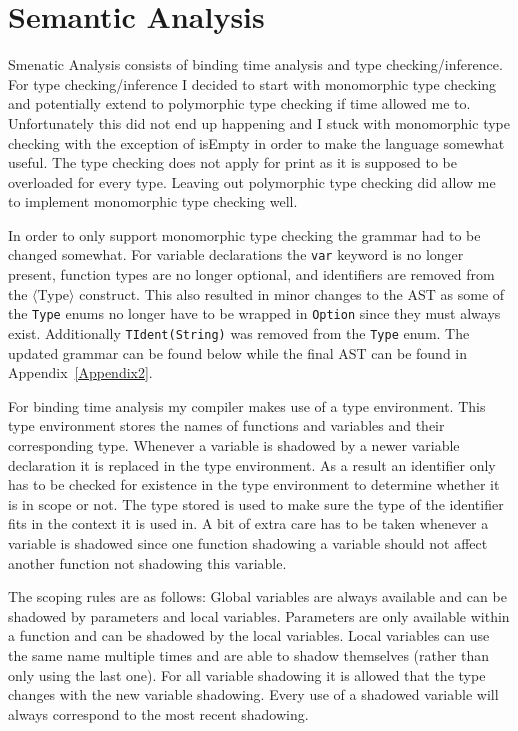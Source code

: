 \documentclass{article}
\begin{document}
\section{Semantic Analysis}
Smenatic Analysis consists of binding time analysis and type checking/inference. For type checking/inference I decided to start with monomorphic type checking and potentially extend to polymorphic type checking if time allowed me to. Unfortunately this did not end up happening and I stuck with monomorphic type checking with the exception of isEmpty in order to make the language somewhat useful. The type checking does not apply for print as it is supposed to be overloaded for every type. Leaving out polymorphic type checking did allow me to implement monomorphic type checking well.

In order to only support monomorphic type checking the grammar had to be changed somewhat. For variable declarations the \texttt{var} keyword is no longer present, function types are no longer optional, and identifiers are removed from the $\langle$Type$\rangle$ construct. This also resulted in minor changes to the AST as some of the \texttt{Type} enums no longer have to be wrapped in \texttt{Option} since they must always exist. Additionally \texttt{TIdent(String)} was removed from the \texttt{Type} enum. The updated grammar can be found below while the final AST can be found in Appendix~\ref{Appendix2}.

For binding time analysis my compiler makes use of a type environment. This type environment stores the names of functions and variables and their corresponding type. Whenever a variable is shadowed by a newer variable declaration it is replaced in the type environment. As a result an identifier only has to be checked for existence in the type environment to determine whether it is in scope or not. The type stored is used to make sure the type of the identifier fits in the context it is used in. A bit of extra care has to be taken whenever a variable is shadowed since one function shadowing a variable should not affect another function not shadowing this variable.

The scoping rules are as follows: Global variables are always available and can be shadowed by parameters and local variables. Parameters are only available within a function and can be shadowed by the local variables. Local variables can use the same name multiple times and are able to shadow themselves (rather than only using the last one). For all variable shadowing it is allowed that the type changes with the new variable shadowing. Every use of a shadowed variable will always correspond to the most recent shadowing.
\end{document}
